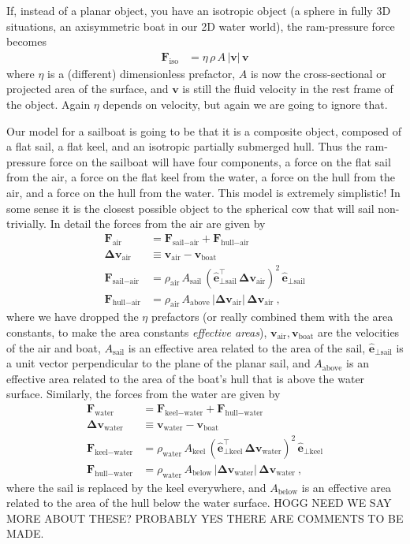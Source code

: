 \documentclass[letterpaper]{article}
\renewcommand{\vec}[1]{\boldsymbol{#1}}
\newcommand{\uvec}{\vec{\hat{e}}}
\newcommand{\iso}{\text{iso}}
\newcommand{\air}{\text{air}}
\newcommand{\water}{\text{water}}
\newcommand{\boat}{\text{boat}}
\newcommand{\sail}{\text{sail}}
\newcommand{\keel}{\text{keel}}
\newcommand{\hull}{\text{hull}}
\renewcommand{\above}{\text{above}}
\newcommand{\below}{\text{below}}
\newcommand{\vair}{\vec{v}_\air}
\newcommand{\vwater}{\vec{v}_\water}
\newcommand{\vboat}{\vec{v}_\boat}
\begin{document}
If, instead of a planar object, you have an isotropic object (a sphere in fully 3D situations, an axisymmetric boat in our 2D water world), the ram-pressure force becomes
\begin{align}\label{eq:iso}
    \vec{F}_\iso &= \eta\,\rho\,A\,|\vec{v}|\,\vec{v}
\end{align}
where $\eta$ is a (different) dimensionless prefactor, $A$ is now the cross-sectional or projected area of the surface, and $\vec{v}$ is still the fluid velocity in the rest frame of the object.
Again $\eta$ depends on velocity, but again we are going to ignore that.

Our model for a sailboat is going to be that it is a composite object, composed of a flat sail, a flat keel, and an isotropic partially submerged hull.
Thus the ram-pressure force on the sailboat will have four components, a force on the flat sail from the air, a force on the flat keel from the water, a force on the hull from the air, and a force on the hull from the water.
This model is extremely simplistic!
In some sense it is the closest possible object to the spherical cow that will sail non-trivially.
In detail the forces from the air are given by
\begin{align}\label{eq:startmodel}
  \vec{F}_\air &= \vec{F}_{\sail-\air} + \vec{F}_{\hull-\air}
  \\
  \vec{\Delta v}_\air &\equiv \vair - \vboat \label{eq:deltav}
  \\
  \vec{F}_{\sail-\air} & = \rho_\air\,A_\sail\,(\uvec_{\perp\sail}^\top\,\vec{\Delta v}_\air)^2\,\uvec_{\perp\sail} \label{eq:Fsailair}
  \\
  \vec{F}_{\hull-\air} & = \rho_\air\,A_{\above}\,|\vec{\Delta v}_\air|\,\vec{\Delta v}_\air \label{eq:Fhullair} ~,
\end{align}
where we have dropped the $\eta$ prefactors (or really combined them with the area constants, to make the area constants \emph{effective areas}), $\vair,\vboat$ are the velocities of the air and boat, $A_\sail$ is an effective area related to the area of the sail, $\uvec_{\perp\sail}$ is a unit vector perpendicular to the plane of the planar sail, and $A_{\above}$ is an effective area related to the area of the boat's hull that is above the water surface.
Similarly, the forces from the water are given by
\begin{align}
  \vec{F}_\water &= \vec{F}_{\keel-\water} + \vec{F}_{\hull-\water}
  \\
  \vec{\Delta v}_\water &\equiv \vwater - \vboat
  \\
  \vec{F}_{\keel-\water} & = \rho_\water\,A_\keel\,(\uvec_{\perp\keel}^\top\,\vec{\Delta v}_\water)^2\,\uvec_{\perp\keel}
  \\
  \vec{F}_{\hull-\water} & = \rho_\water\,A_{\below}\,|\vec{\Delta v}_\water|\,\vec{\Delta v}_\water ~,\label{eq:endmodel}
\end{align}
where the sail is replaced by the keel everywhere, and $A_{\below}$ is an effective area related to the area of the hull below the water surface.
HOGG NEED WE SAY MORE ABOUT THESE? PROBABLY YES THERE ARE COMMENTS TO BE MADE.
\end{document}
